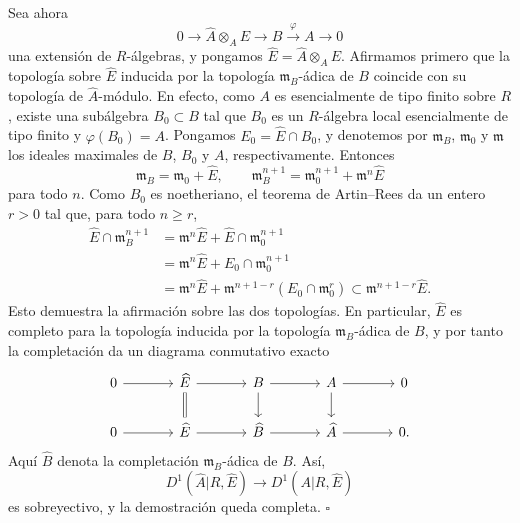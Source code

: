 Sea ahora
\[
 0\longrightarrow\widehat A\otimes_AE\longrightarrow B
 \xrightarrow{\ \varphi\ }A\longrightarrow0
\]
una extensión de $R$-álgebras, y pongamos
$\widehat E=\widehat A\otimes_AE$. Afirmamos primero que la topología
sobre $\widehat E$ inducida por la topología $\mathfrak m_B$-ádica de
$B$ coincide con su topología de $\widehat A$-módulo. En efecto, como
$A$ es esencialmente de tipo finito sobre $R$, existe una subálgebra
$B_0\subset B$ tal que $B_0$ es un $R$-álgebra local esencialmente de
tipo finito y $\varphi(B_0)=A$. Pongamos $E_0=\widehat E\cap B_0$, y
denotemos por $\mathfrak m_B$, $\mathfrak m_0$ y $\mathfrak m$ los
ideales maximales de $B$, $B_0$ y $A$, respectivamente. Entonces
\[
 \mathfrak m_B=\mathfrak m_0+\widehat E,
 \qquad
 \mathfrak m_B^{n+1}=\mathfrak m_0^{n+1}
   +\mathfrak m^n\widehat E
\]
para todo $n$. Como $B_0$ es noetheriano, el teorema de Artin--Rees
da un entero $r>0$ tal que, para todo $n\geq r$,
\begin{align*}
 \widehat E\cap\mathfrak m_B^{n+1}
 &=\mathfrak m^n\widehat E
   +\widehat E\cap\mathfrak m_0^{n+1}\\
 &=\mathfrak m^n\widehat E
   +E_0\cap\mathfrak m_0^{n+1}\\
 &=\mathfrak m^n\widehat E
   +\mathfrak m^{n+1-r}(E_0\cap\mathfrak m_0^r)
 \subset\mathfrak m^{n+1-r}\widehat E.
\end{align*}
Esto demuestra la afirmación sobre las dos topologías. En particular,
$\widehat E$ es completo para la topología inducida por la topología
$\mathfrak m_B$-ádica de $B$, y por tanto la completación da un
diagrama conmutativo exacto
\[
\begin{tikzcd}[column sep=large]
0 \arrow[r] & \widehat E \arrow[r] \arrow[d,equal]
& B \arrow[r] \arrow[d]
& A \arrow[r] \arrow[d] & 0 \\
0 \arrow[r] & \widehat E \arrow[r]
& \widehat B \arrow[r]
& \widehat A \arrow[r] & 0.
\end{tikzcd}
\]
Aquí $\widehat B$ denota la completación $\mathfrak m_B$-ádica de
$B$. Así,
\[
 D^1(\widehat A|R,\widehat E)
 \longrightarrow D^1(A|R,\widehat E)
\]
es sobreyectivo, y la demostración queda completa.
\hfill$\square$

